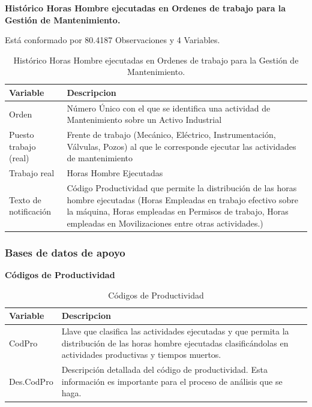 \documentclass[
  11pt,
  bookmarksnumbered]{article}
\begin{document}
\newpage

\textbf{Histórico Horas Hombre ejecutadas en Ordenes de trabajo para la Gestión de Mantenimiento.}

Está conformado por 80.4187 Observaciones y 4 Variables.

\begin{table}[H]

\caption{\label{tab:unnamed-chunk-7}Histórico Horas Hombre ejecutadas en Ordenes de trabajo para la Gestión de Mantenimiento.}
\centering
\fontsize{9}{11}\selectfont
\begin{tabular}[t]{l|>{\raggedright\arraybackslash}p{35em}}
\hline
Variable & Descripcion\\
\hline
Orden & Número Único con el que se identifica una actividad de Mantenimiento sobre un Activo Industrial\\
\hline
Puesto trabajo (real) & Frente de trabajo (Mecánico, Eléctrico, Instrumentación, Válvulas, Pozos) al que le corresponde ejecutar las actividades de mantenimiento\\
\hline
Trabajo real & Horas Hombre Ejecutadas\\
\hline
Texto de notificación & Código Productividad que permite la distribución de las horas hombre ejecutadas (Horas Empleadas en trabajo efectivo sobre la máquina, Horas empleadas en Permisos de trabajo, Horas empleadas en Movilizaciones entre otras actividades.)\\
\hline
\end{tabular}
\end{table}

\hypertarget{bases-de-datos-de-apoyo}{%
\subsubsection{Bases de datos de apoyo}\label{bases-de-datos-de-apoyo}}

\textbf{Códigos de Productividad}

\begin{table}[H]

\caption{\label{tab:unnamed-chunk-8}Códigos de Productividad}
\centering
\fontsize{9}{11}\selectfont
\begin{tabular}[t]{l|>{\raggedright\arraybackslash}p{35em}}
\hline
Variable & Descripcion\\
\hline
CodPro & Llave que clasifica las actividades ejecutadas y que permita la distribución de las horas hombre ejecutadas clasificándolas en actividades productivas y tiempos muertos.\\
\hline
Des.CodPro & Descripción detallada del código de productividad. Esta información es importante para el proceso de análisis que se haga.\\
\hline
\end{tabular}
\end{table}
\end{document}
